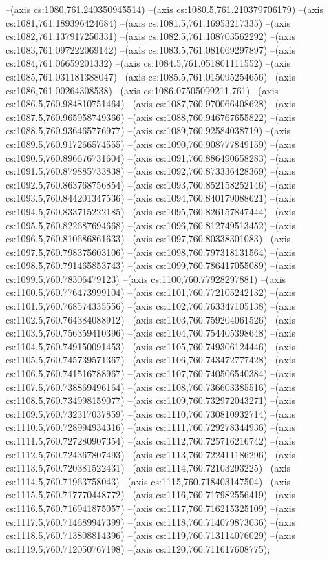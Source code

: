 --(axis cs:1080,761.240350945514)
--(axis cs:1080.5,761.210379706179)
--(axis cs:1081,761.189396424684)
--(axis cs:1081.5,761.16953217335)
--(axis cs:1082,761.137917250331)
--(axis cs:1082.5,761.108703562292)
--(axis cs:1083,761.097222069142)
--(axis cs:1083.5,761.081069297897)
--(axis cs:1084,761.06659201332)
--(axis cs:1084.5,761.051801111552)
--(axis cs:1085,761.031181388047)
--(axis cs:1085.5,761.015095254656)
--(axis cs:1086,761.00264308538)
--(axis cs:1086.07505099211,761)
--(axis cs:1086.5,760.984810751464)
--(axis cs:1087,760.970066408628)
--(axis cs:1087.5,760.965958749366)
--(axis cs:1088,760.946767655822)
--(axis cs:1088.5,760.936465776977)
--(axis cs:1089,760.92584038719)
--(axis cs:1089.5,760.917266574555)
--(axis cs:1090,760.908777849159)
--(axis cs:1090.5,760.896676731604)
--(axis cs:1091,760.886490658283)
--(axis cs:1091.5,760.879885733838)
--(axis cs:1092,760.873336428369)
--(axis cs:1092.5,760.863768756854)
--(axis cs:1093,760.852158252146)
--(axis cs:1093.5,760.844201347536)
--(axis cs:1094,760.840179088621)
--(axis cs:1094.5,760.833715222185)
--(axis cs:1095,760.826157847444)
--(axis cs:1095.5,760.822687694668)
--(axis cs:1096,760.812749513452)
--(axis cs:1096.5,760.810686861633)
--(axis cs:1097,760.80338301083)
--(axis cs:1097.5,760.798375603106)
--(axis cs:1098,760.797318131564)
--(axis cs:1098.5,760.791465853743)
--(axis cs:1099,760.786417055089)
--(axis cs:1099.5,760.78306479123)
--(axis cs:1100,760.77928297881)
--(axis cs:1100.5,760.776473999104)
--(axis cs:1101,760.772105242132)
--(axis cs:1101.5,760.768574335556)
--(axis cs:1102,760.763347105138)
--(axis cs:1102.5,760.764384088912)
--(axis cs:1103,760.759204061526)
--(axis cs:1103.5,760.756359410396)
--(axis cs:1104,760.754405398648)
--(axis cs:1104.5,760.749150091453)
--(axis cs:1105,760.749306124446)
--(axis cs:1105.5,760.745739571367)
--(axis cs:1106,760.743472777428)
--(axis cs:1106.5,760.741516788967)
--(axis cs:1107,760.740506540384)
--(axis cs:1107.5,760.738869496164)
--(axis cs:1108,760.736603385516)
--(axis cs:1108.5,760.734998159077)
--(axis cs:1109,760.732972043271)
--(axis cs:1109.5,760.732317037859)
--(axis cs:1110,760.730810932714)
--(axis cs:1110.5,760.728994934316)
--(axis cs:1111,760.729278344936)
--(axis cs:1111.5,760.727280907354)
--(axis cs:1112,760.725716216742)
--(axis cs:1112.5,760.724367807493)
--(axis cs:1113,760.722411186296)
--(axis cs:1113.5,760.720381522431)
--(axis cs:1114,760.72103293225)
--(axis cs:1114.5,760.71963758043)
--(axis cs:1115,760.718403147504)
--(axis cs:1115.5,760.717770448772)
--(axis cs:1116,760.717982556419)
--(axis cs:1116.5,760.716941875057)
--(axis cs:1117,760.716215325109)
--(axis cs:1117.5,760.714689947399)
--(axis cs:1118,760.714079873036)
--(axis cs:1118.5,760.713808814396)
--(axis cs:1119,760.713114076029)
--(axis cs:1119.5,760.712050767198)
--(axis cs:1120,760.711617608775);
